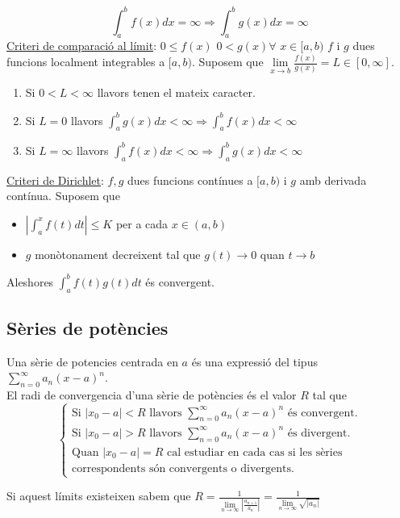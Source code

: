 \documentclass[../main.tex]{subfiles}
\begin{document}
    \begin{displaymath}
        \int_a^b f(x)dx = \infty \Rightarrow \int_a^b g(x) dx = \infty
    \end{displaymath}
    \underline{Criteri de comparació al límit}: $0 \leq f(x)$ $0 < g(x) \forall$ $x \in [a, b)$ $f$ i $g$ dues funcions localment integrables a $[a, b)$. Suposem que $\lim\limits_{x \rightarrow b} \frac{f(x)}{g(x)} = L \in [0, \infty]$.\\
    \begin{enumerate}
        \item Si $0 < L < \infty$ llavors tenen el mateix caracter.
        \item Si $L = 0$ llavors $\int_a^b g(x) dx < \infty \Rightarrow \int_a^b f(x) dx < \infty$
        \item Si $L = \infty$ llavors $\int_a^b f(x) dx < \infty \Rightarrow \int_a^b g(x) dx < \infty$
    \end{enumerate}
    \underline{Criteri de Dirichlet}: $f, g$ dues funcions contínues a $[a, b)$ i $g$ amb derivada contínua. Suposem que \begin{itemize}
        \item $|\int_a^x f(t) dt| \leq K$ per a cada $x \in (a, b)$
        \item $g$ monòtonament decreixent tal que $g(t) \longrightarrow 0$ quan $t \rightarrow b$
    \end{itemize}
    Aleshores $\int_a^b f(t) g(t) dt$ és convergent.\\
    \subsection{Sèries de potències}
    Una sèrie de potencies centrada en $a$ és una expressió del tipus $\sum\limits_{n=0}^\infty a_n(x-a)^n$.\\
    El radi de convergencia d'una sèrie de potències és el valor $R$ tal que
    \begin{displaymath}\begin{cases}
        \text{Si } |x_0 - a| < R \text{ llavors } \sum\limits_{n=0}^\infty a_n(x-a)^n \text{ és convergent.}\\
        \text{Si } |x_0 - a| > R \text{ llavors } \sum\limits_{n=0}^\infty a_n(x-a)^n \text{ és divergent.}\\
        \text{Quan } |x_0 - a| = R \text{ cal estudiar en cada cas si les sèries}\\
        \text{correspondents són convergents o divergents.}
    \end{cases}\end{displaymath}
    
    Si aquest límits existeixen sabem que $R = \frac{1}{\lim\limits_{n\rightarrow \infty} |\frac{a_{n+1}}{a_n}|} = \frac{1}{\lim\limits_{n\rightarrow \infty} \sqrt{|a_n|}}$
\end{document}
